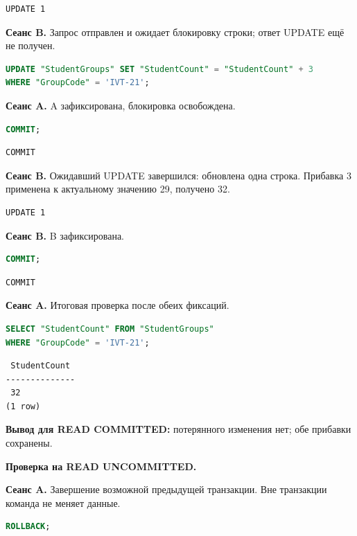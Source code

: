 \documentclass[12pt,a4paper]{article}
\begin{document}
\begin{lstlisting}
UPDATE 1
\end{lstlisting}

\textbf{Сеанс B.} Запрос отправлен и ожидает блокировку строки; ответ UPDATE ещё не получен.
\begin{lstlisting}[language=SQL]
UPDATE "StudentGroups" SET "StudentCount" = "StudentCount" + 3
WHERE "GroupCode" = 'IVT-21';
\end{lstlisting}

\textbf{Сеанс A.} A зафиксирована, блокировка освобождена.
\begin{lstlisting}[language=SQL]
COMMIT;
\end{lstlisting}

\begin{lstlisting}
COMMIT
\end{lstlisting}

\textbf{Сеанс B.} Ожидавший UPDATE завершился: обновлена одна строка. Прибавка 3 применена к актуальному значению 29, получено 32.

\begin{lstlisting}
UPDATE 1
\end{lstlisting}

\textbf{Сеанс B.} B зафиксирована.
\begin{lstlisting}[language=SQL]
COMMIT;
\end{lstlisting}

\begin{lstlisting}
COMMIT
\end{lstlisting}

\textbf{Сеанс A.} Итоговая проверка после обеих фиксаций.
\begin{lstlisting}[language=SQL]
SELECT "StudentCount" FROM "StudentGroups"
WHERE "GroupCode" = 'IVT-21';
\end{lstlisting}

\begin{lstlisting}
 StudentCount
--------------
 32
(1 row)
\end{lstlisting}

\textbf{Вывод для READ COMMITTED:} потерянного изменения нет; обе прибавки сохранены.

\textbf{Проверка на READ UNCOMMITTED.}

\textbf{Сеанс A.} Завершение возможной предыдущей транзакции. Вне транзакции команда не меняет данные.
\begin{lstlisting}[language=SQL]
ROLLBACK;
\end{lstlisting}
\end{document}
